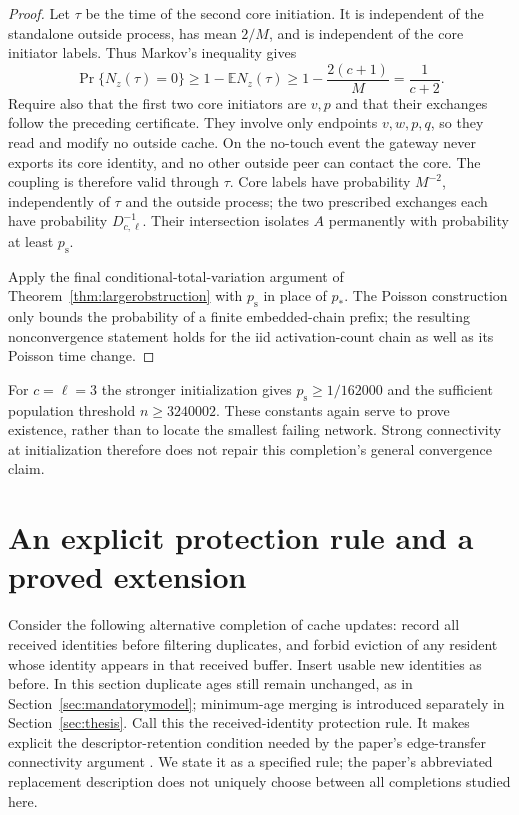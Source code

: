 \documentclass[11pt]{article}
\begin{document}
\begin{proof}
Let $\tau$ be the time of the second core initiation.
It is independent of the standalone outside process, has
mean $2/M$, and is independent of the core initiator labels.
Thus Markov's inequality gives
\[
 \Pr\{N_z(\tau)=0\}
 \ge1-\mathbb E N_z(\tau)
 \ge1-\frac{2(c+1)}M=\frac1{c+2}.
\]
Require also that the first two core initiators are $v,p$
and that their exchanges follow the preceding certificate.
They involve only endpoints $v,w,p,q$, so they read and
modify no outside cache. On the no-touch event the gateway
never exports its core identity, and no other outside peer
can contact the core. The coupling is therefore valid
through $\tau$. Core labels have probability $M^{-2}$,
independently of $\tau$ and the outside process; the two
prescribed exchanges each have probability $D_{c,\ell}^{-1}$.
Their intersection isolates $A$ permanently with probability
at least $p_{\mathrm s}$.

Apply the final conditional-total-variation argument of
Theorem~\ref{thm:largerobstruction} with $p_{\mathrm s}$ in
place of $p_*$. The Poisson construction only bounds the
probability of a finite embedded-chain prefix; the resulting
nonconvergence statement holds for the iid activation-count
chain as well as its Poisson time change.
\end{proof}

For $c=\ell=3$ the stronger initialization gives
$p_{\mathrm s}\ge1/162000$ and the sufficient population
threshold $n\ge3240002$. These constants again serve to prove
existence, rather than to locate the smallest failing network.
Strong connectivity at initialization therefore does not
repair this completion's general convergence claim.

\section{An explicit protection rule and a proved extension}
\label{sec:protected}

Consider the following alternative completion of cache updates:
record all received identities before filtering duplicates, and
forbid eviction of any resident whose identity appears in that
received buffer. Insert usable new identities as before.
In this section duplicate ages still remain unchanged, as in
Section~\ref{sec:mandatorymodel}; minimum-age merging is introduced
separately in Section~\ref{sec:thesis}.
Call this the received-identity protection rule.
It makes explicit the descriptor-retention condition needed by
the paper's edge-transfer connectivity argument
\cite[Section 3.1]{cyclon}. We state it as a specified rule;
the paper's abbreviated replacement description does not uniquely
choose between all completions studied here.
\end{document}
